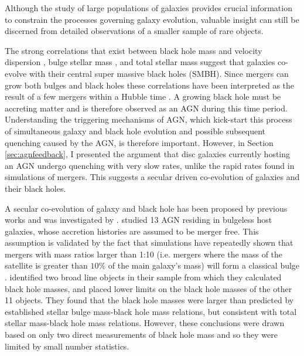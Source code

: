 
Although the study of large populations of galaxies provides crucial information to constrain the processes governing galaxy evolution, valuable insight can still be discerned from detailed observations of a smaller sample of rare objects. 

The strong correlations that exist between black hole mass and velocity dispersion \citep{magorrian98, merritt01, hu08, kormendy11a, mcconnell11}, bulge stellar mass \citep{marconi03, haringrix04}, and total stellar mass \citep{cisternas11, Simmons13} suggest that galaxies co-evolve with their central super massive black holes (SMBH). Since mergers can grow both bulges and black holes these correlations have been interpreted as the result of a few mergers within a Hubble time \citep{peng07, hopkins08a, jahnke11}. A growing black hole must be accreting matter and is therefore observed as an AGN during this time period. Understanding the triggering mechanisms of AGN, which kick-start this process of simultaneous galaxy and black hole evolution and possible subsequent quenching caused by the AGN, is therefore important. However, in Section \ref{sec:agnfeedback}, I presented the argument that disc galaxies currently hosting an AGN undergo quenching with very slow rates, unlike the rapid rates found in simulations of mergers. This suggests a secular driven co-evolution of galaxies and their black holes. 

A secular co-evolution of galaxy and black hole has been proposed by previous works \citep{greene10b, jiang11b, cisternas11, Simmons11,schawinski11, kocevski12} and was investigated by \citet{Simmons13}. \citeauthor{Simmons13}  studied 13 AGN residing in bulgeless host galaxies, whose accretion histories are assumed to be merger free. This assumption is validated by the fact that simulations have repeatedly shown that mergers with mass ratios larger than 1:10 (i.e. mergers where the mass of the satellite is greater than $10\%$ of the main galaxy's mass) will form a classical bulge \citep{walker96, hopkins11c, tonini16}. \citeauthor{Simmons13} identified two broad line objects in their sample from which they calculated black hole masses, and placed lower limits on the black hole masses of the other 11 objects. They found that the black hole masses were larger than predicted by established stellar bulge mass-black hole mass relations, but consistent with total stellar mass-black hole mass relations. However, these conclusions were drawn based on only two direct measurements of black hole mass and so they were limited by small number statistics.

